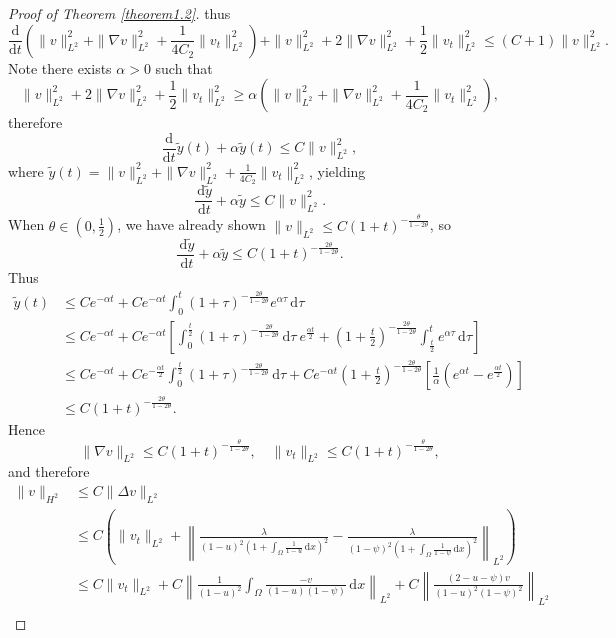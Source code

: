 \documentclass{article}
\numberwithin{equation}{section}
\begin{document}
\begin{proof}[Proof of Theorem \ref{theorem1.2}]
thus
$$\frac{\mathrm{d}}{\mathrm{d}t}\left(\|v\|_{L^2}^2+\|\nabla v\|_{L^2}^2+\frac{1}{4C_2}\|v_t\|_{L^2}^2\right)+\|v\|_{L^2}^{2}+2\|\nabla v\|_{L^2}^2+\frac{1}{2}\|v_t\|_{L^2}^2\le (C+1)\|v\|_{L^2}^{2}.$$
Note there exists $\alpha>0$ such that
$$\|v\|_{L^2}^{2}+2\|\nabla v\|_{L^2}^2+\frac{1}{2}\|v_t\|_{L^2}^2\ge \alpha\left(\|v\|_{L^2}^2+\|\nabla v\|_{L^2}^2+\frac{1}{4C_2}\|v_t\|_{L^2}^2\right),$$
therefore
$$\frac{\mathrm{d}}{\mathrm{d}t}\widetilde{y}(t)+\alpha\widetilde{y}(t)\le C\|v\|_{L^2}^{2},$$
where $\widetilde{y}(t)=\|v\|_{L^2}^2+\|\nabla v\|_{L^2}^2+\frac{1}{4C_2}\|v_t\|_{L^2}^2$, yielding
\begin{equation}
    \frac{\,\mathrm{d}\widetilde{y}}{\,\mathrm{d}t}+\alpha\widetilde{y}\le C\|v\|_{L^2}^{2}.\label{4.6}
\end{equation}
When $\theta\in (0,\frac{1}{2})$, we have already shown $\|v\|_{L^2}\le C(1+t)^{-\frac{\theta}{1-2\theta}}$, so
$$\frac{\,\mathrm{d}\widetilde{y}}{\,\mathrm{d}t}+\alpha\widetilde{y}\le C(1+t)^{-\frac{2\theta}{1-2\theta}}.$$
Thus
\begin{align*}
    \widetilde{y}(t)&\le Ce^{-\alpha t}+Ce^{-\alpha t}\int_{0}^{t}(1+\tau)^{-\frac{2\theta}{1-2\theta}}e^{\alpha \tau}\,\mathrm{d}\tau\\
    &\le Ce^{-\alpha t}+Ce^{-\alpha t}\left[\int_{0}^{\frac{t}{2}}(1+\tau)^{-\frac{2\theta}{1-2\theta}}\,\mathrm{d}\tau\ e^{\frac{\alpha t}{2}}+(1+\frac{t}{2})^{-\frac{2\theta}{1-2\theta}}\int_{\frac{t}{2}}^{t}e^{\alpha\tau}\,\mathrm{d}\tau\right]\\
    &\le Ce^{-\alpha t}+Ce^{-\frac{\alpha t}{2}}\int_{0}^{\frac{t}{2}}(1+\tau)^{-\frac{2\theta}{1-2\theta}}\,\mathrm{d}\tau +Ce^{-\alpha t}(1+\frac{t}{2})^{-\frac{2\theta}{1-2\theta}}\left[\frac{1}{\alpha}(e^{\alpha t}-e^{\frac{\alpha t}{2}})\right]\\
    &\le C(1+t)^{-\frac{2\theta}{1-2\theta}}.
\end{align*}
Hence
$$\|\nabla v\|_{L^2}\le C(1+t)^{-\frac{\theta}{1-2\theta}},\quad \|v_t\|_{L^2}\le C(1+t)^{-\frac{\theta}{1-2\theta}},$$
and therefore
\begin{align*}
    \|v\|_{H^2}&\le C\|\Delta v\|_{L^2}\\
    &\le C\left(\|v_t\|_{L^2}+\left\|\frac{\lambda}{(1-u)^2(1+\int_{\Omega}\frac{1}{1-u}\,\mathrm{d}x)^2}-\frac{\lambda}{(1-\psi)^2(1+\int_{\Omega}\frac{1}{1-\psi}\,\mathrm{d}x)^2}\right\|_{L^2}\right)\\
    &\le C\|v_t\|_{L^2}+C\left\|\frac{1}{(1-u)^2}\int_{\Omega}\frac{-v}{(1-u)(1-\psi)}\,\mathrm{d}x\right\|_{L^2}+C\left\|\frac{(2-u-\psi)v}{(1-u)^2(1-\psi)^2}\right\|_{L^2}\\

\end{align*}
\end{proof}
\end{document}
